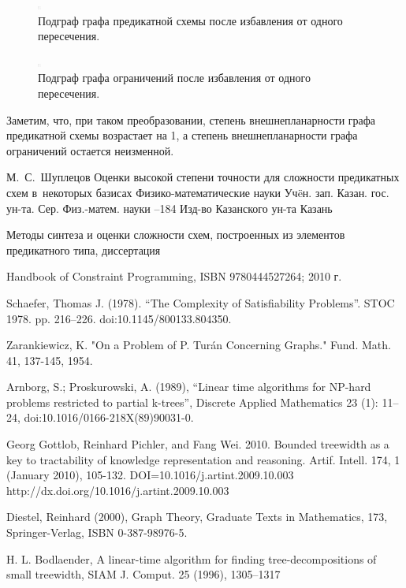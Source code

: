 \documentclass[12pt]{article}
\begin{document}
\begin{figure}[htb]
\centering
\includegraphics[width=0.01\textwidth]{constraint_graph.png}
\caption{Подграф графа предикатной схемы после избавления от одного пересечения.}
\label{fig:make_planar_induced}
\end{figure}

\begin{figure}[htb]
\centering
\includegraphics[width=0.01\textwidth]{constraint_graph.png}
\caption{Подграф графа ограничений после избавления от одного пересечения.}
\label{fig:make_planar_constraint}
\end{figure}

Заметим, что, при таком преобразовании, степень внешнепланарности графа предикатной схемы возрастает на 1, а 
степень внешнепланарности графа ограничений остается неизменной.

\clearpage
{}
    \by М.~С.~Шуплецов
    \paper Оценки высокой степени точности для сложности предикатных схем в~некоторых базисах
    \inbook Физико-математические науки
    \serial Уч\"eн. зап. Казан. гос. ун-та. Сер. Физ.-матем. науки
    --184
    \publ Изд-во Казанского ун-та
    \publaddr Казань

Методы синтеза и оценки сложности схем, построенных из элементов предикатного типа, диссертация

 Handbook of Constraint Programming, ISBN 9780444527264; 2010 г.

 Schaefer, Thomas J. (1978). 
``The Complexity of Satisfiability Problems''. STOC 1978. pp. 216–226. doi:10.1145/800133.804350.

 Zarankiewicz, K. "On a Problem of P. Turán Concerning Graphs." Fund. Math. 41, 137-145, 1954. 

 Arnborg, S.; Proskurowski, A. (1989), 
``Linear time algorithms for NP-hard problems restricted to partial k-trees'',
Discrete Applied Mathematics 23 (1): 11–24, doi:10.1016/0166-218X(89)90031-0.

Georg Gottlob, Reinhard Pichler, and Fang Wei. 2010. Bounded treewidth as a key to tractability of knowledge representation and reasoning. Artif. Intell. 174, 1 (January 2010), 105-132. DOI=10.1016/j.artint.2009.10.003 http://dx.doi.org/10.1016/j.artint.2009.10.003

Diestel, Reinhard (2000), Graph Theory, Graduate Texts in Mathematics, 
173, Springer-Verlag, ISBN 0-387-98976-5.

H. L. Bodlaender, A linear-time algorithm for finding 
tree-decompositions of small
treewidth, SIAM J. Comput. 25 (1996), 1305–1317


\endthebibliography
\end{document}
